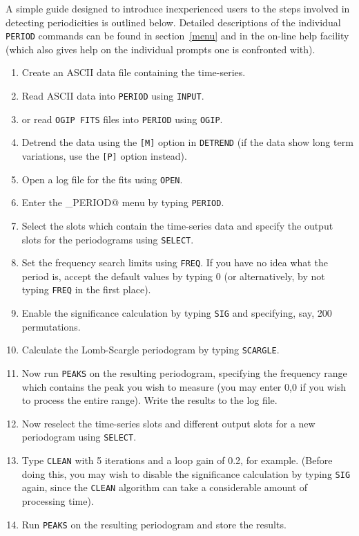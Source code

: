 A simple guide designed to introduce inexperienced users to the steps involved
in detecting periodicities is outlined below. Detailed descriptions of the
individual {\tt PERIOD} commands can be found in section~\ref{menu} and in
the on-line help facility (which also gives help on the individual prompts
one is confronted with).

\begin{enumerate}
\item Create an ASCII data file containing the time-series.
\item Read ASCII data into {\tt PERIOD} using {\tt INPUT}.
\item or read {\tt OGIP FITS} files into {\tt PERIOD} using {\tt OGIP}.
\item Detrend the data using the {\tt [M]} option in {\tt DETREND} (if the
data show long term variations, use the {\tt [P]} option instead).
\item Open a log file for the fits using {\tt OPEN}.
\item Enter the \verb@PERIOD_PERIOD@ menu by typing {\tt PERIOD}.
\item Select the slots which contain the time-series data and specify the output
slots for the periodograms using {\tt SELECT}.
\item Set the frequency search limits using {\tt FREQ}. If you have no idea
what the period is, accept the default values by typing 0 (or alternatively,
by not typing {\tt FREQ} in the first place).
\item Enable the significance calculation by typing {\tt SIG} and specifying,
say, 200 permutations.
\item Calculate the Lomb-Scargle periodogram by typing {\tt SCARGLE}.
\item Now run {\tt PEAKS} on the resulting periodogram, specifying the
frequency range which contains the peak you wish to measure (you may enter 0,0
if you wish to process the entire range). Write the results to the log file.
\item Now reselect the time-series slots and different output slots for a new
periodogram using {\tt SELECT}.
\item Type {\tt CLEAN} with 5 iterations and a loop gain of 0.2, for example.
(Before doing this, you may wish to disable the significance calculation by
typing {\tt SIG} again, since the {\tt CLEAN} algorithm can take a
considerable amount of processing time).
\item Run {\tt PEAKS} on the resulting periodogram and store the results.

\end{enumerate}
